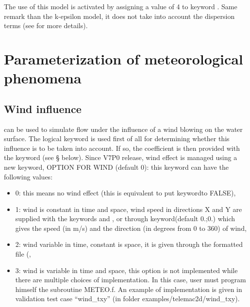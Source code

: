  The use of this model is activated by assigning a value of 4 to keyword . Same remark than the k-epsilon model, it does not take into account the dispersion terms (see \cite{Smagorinsky1963} for more details).


\section{ Parameterization of meteorological phenomena}
\label{sec:param:met:phen}

\subsection{ Wind influence}

  can be used to simulate flow under the influence of a wind blowing on the water surface. The logical keyword   is used first of all for determining whether this influence is to be taken into account. If so, the coefficient is then provided with the keyword  (see {\S} below). Since V7P0 release, wind effect is managed using a new keyword, OPTION FOR WIND (default 0): this keyword can have the following values:

\begin{itemize}
\item [\nonumber] 0: this means no wind effect (this is equivalent to put keywordto FALSE),

\item [\nonumber]1: wind is constant in time and space, wind speed in directions X and Y are supplied with the keywords  and , or through keyword(default 0.;0.) which gives the speed (in m/s) and the direction (in degrees from 0 to 360) of wind,

\item [\nonumber] 2: wind variable in time, constant is space, it is given through the formatted file (,

\item [\nonumber] 3: wind is variable in time and space, this option is not implemented while there are multiple choices of implementation. In this case, user must program himself the subroutine METEO.f. An example of implementation is given in validation test case ``wind\_txy'' (in folder examples/telemac2d/wind\_txy).
\end{itemize}

